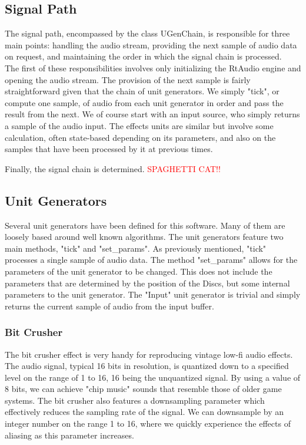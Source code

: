 \documentclass[pdftext,twoside,10pt]{article}
\newcommand{\spag}{\textcolor{red}{SPAGHETTI CAT!!}}
\begin{document}
\subsection{Signal Path}
The signal path, encompassed by the class UGenChain, is responsible for three main points: handling the audio stream, providing the next sample of audio data on request, and maintaining the order in which the signal chain is processed.\\
The first of these responsibilities involves only initializing the RtAudio engine and opening the audio stream. The provision of the next sample is fairly straightforward given that the chain of unit generators. We simply "tick", or compute one sample, of audio from each unit generator in order and pass the result from the next. We of course start with an input source, who simply returns a sample of the audio input. The effects units are similar but involve some calculation, often state-based depending on its parameters, and also on the samples that have been processed by it at previous times.

Finally, the signal chain is determined. \spag

\subsection{Unit Generators}
Several unit generators have been defined for this software. Many of them are loosely based around well known algorithms. The unit generators feature two main methods, "tick" and "set\_params". As previously mentioned, "tick" processes a single sample of audio data. The method "set\_params" allows for the parameters of the unit generator to be changed. This does not include the parameters that are determined by the position of the Discs, but some internal parameters to the unit generator. The "Input" unit generator is trivial and simply returns the current sample of audio from the input buffer.

\subsubsection*{Bit Crusher}
The bit crusher effect is very handy for reproducing vintage low-fi audio effects. The audio signal, typical 16 bits in resolution, is quantized down to a specified level on the range of 1 to 16, 16 being the unquantized signal. By using a value of 8 bits, we can achieve "chip music" sounds that resemble those of older game systems. The bit crusher also features a downsampling parameter which effectively reduces the sampling rate of the signal. We can downsample by an integer number on the range 1 to 16, where we quickly experience the effects of aliasing as this parameter increases.
\end{document}
